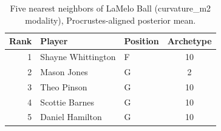 \begin{table}[htbp]
  \centering\small
  \begin{tabular}{rllc}
    \toprule
    Rank & Player & Position & Archetype \\
    \midrule
    1 & Shayne Whittington & F & 10 \\
    2 & Mason Jones & G & 2 \\
    3 & Theo Pinson & G & 10 \\
    4 & Scottie Barnes & G & 10 \\
    5 & Daniel Hamilton & G & 10 \\
    \bottomrule
  \end{tabular}
  \caption{Five nearest neighbors of LaMelo Ball (curvature_m2 modality), Procrustes-aligned posterior mean.}
  \label{tab:LaMelo_Ball_neighbors_curvature_m2}
\end{table}

